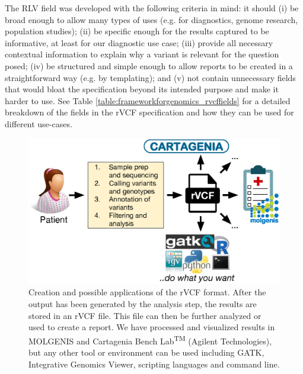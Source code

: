 The RLV field was developed with the following criteria in mind: it should (i) be broad enough to allow many types of uses (e.g. for diagnostics, genome research, population studies); (ii) be specific enough for the results captured to be informative, at least for our diagnostic use case; (iii) provide all necessary contextual information to explain why a variant is relevant for the question posed; (iv) be structured and simple enough to allow reports to be created in a straightforward way (e.g. by templating); and (v) not contain unnecessary fields that would bloat the specification beyond its intended purpose and make it harder to use.
See Table \ref{table:frameworkforgenomics_rvcffields} for a detailed breakdown of the fields in the rVCF specification and how they can be used for different use-cases.\\

\begin{figure}
\centering
\includegraphics[width=1.0\linewidth]{img/frameworkforgenomics_rvcfapplications}
\caption[Applications of the rVCF format]{Creation and possible applications of the rVCF format. After the output has been generated by the analysis step, the results are stored in an rVCF file. This file can then be further analyzed or used to create a report. We have processed and visualized results in MOLGENIS\cite{Swertz_2010a} and Cartagenia Bench Lab\textsuperscript{TM} (Agilent Technologies), but any other tool or environment can be used including GATK\cite{Van_der_Auwera_2013}, Integrative Genomics Viewer\cite{Thorvaldsdottir_2012}, scripting languages and command line.}
\label{fig:frameworkforgenomics_rvcfapplications}
\end{figure}

